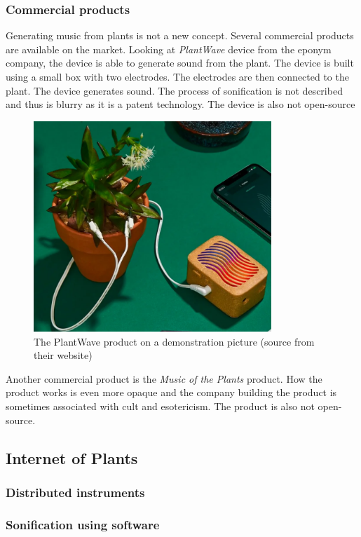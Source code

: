 \subsubsection{Commercial products}

Generating music from plants is not a new concept. Several commercial products are available on the market.
Looking at \textit{PlantWave} device from the eponym company, the device is able to generate sound from the plant. The device is
built using a small box with two electrodes. The electrodes are then connected to the plant. The device generates sound.
The process of sonification is not described and thus is blurry as it is a patent technology. The device is also not open-source

\begin{figure}[h!]
    \centering
    \includegraphics[width=0.8\textwidth]{images/plant_wave_product.png}
    \caption{The PlantWave product on a demonstration picture (source from their website)} 
    \vspace{0.1cm}
    \label{fig:plant_wave_product}
\end{figure}

Another commercial product is the \textit{Music of the Plants} product. How the product works is even more opaque and the company building the product
is sometimes associated with cult and esotericism. The product is also not open-source.


\subsection{Internet of Plants}

\subsubsection{Distributed instruments}

\subsubsection{Sonification using software}